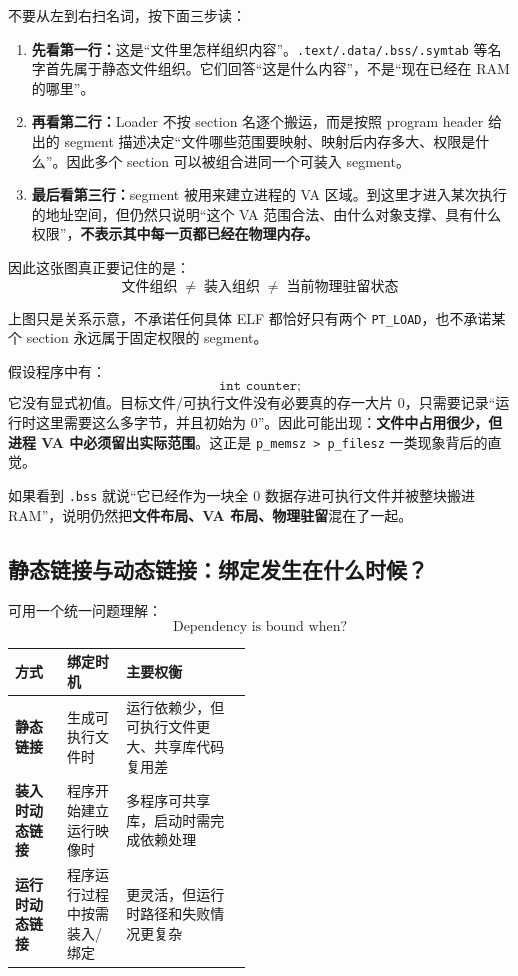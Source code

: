 \documentclass[11pt,a4paper]{ctexart}
\newcommand{\kw}[1]{\textbf{#1}}
\newcommand{\code}[1]{\texttt{#1}}
\begin{document}
\begin{method}[怎样一步一步读这张图？]
不要从左到右扫名词，按下面三步读：
\begin{enumerate}
  \item \kw{先看第一行：}这是“文件里怎样组织内容”。\code{.text/.data/.bss/.symtab} 等名字首先属于静态文件组织。它们回答“这是什么内容”，不是“现在已经在 RAM 的哪里”。
  \item \kw{再看第二行：}Loader 不按 section 名逐个搬运，而是按照 program header 给出的 segment 描述决定“文件哪些范围要映射、映射后内存多大、权限是什么”。因此多个 section 可以被组合进同一个可装入 segment。
  \item \kw{最后看第三行：}segment 被用来建立进程的 VA 区域。到这里才进入某次执行的地址空间，但仍然只说明“这个 VA 范围合法、由什么对象支撑、具有什么权限”，\textbf{不表示其中每一页都已经在物理内存。}
\end{enumerate}

因此这张图真正要记住的是：
\[
\boxed{\text{文件组织}\;\neq\;\text{装入组织}\;\neq\;\text{当前物理驻留状态}}
\]

上图只是关系示意，不承诺任何具体 ELF 都恰好只有两个 \code{PT\_LOAD}，也不承诺某个 section 永远属于固定权限的 segment。
\end{method}

\begin{method}
假设程序中有：
\[
\code{int counter;} 
\]
它没有显式初值。目标文件/可执行文件没有必要真的存一大片 0，只需要记录“运行时这里需要这么多字节，并且初始为 0”。因此可能出现：\kw{文件中占用很少，但进程 VA 中必须留出实际范围}。这正是 \code{p\_memsz > p\_filesz} 一类现象背后的直觉。

如果看到 \code{.bss} 就说“它已经作为一块全 0 数据存进可执行文件并被整块搬进 RAM”，说明仍然把\kw{文件布局、VA 布局、物理驻留}混在了一起。
\end{method}

\subsection{静态链接与动态链接：绑定发生在什么时候？}

可用一个统一问题理解：
\[
\boxed{\text{Dependency is bound when?}}
\]

\begin{center}
\small
\renewcommand{\arraystretch}{1.25}
\begin{tabularx}{\linewidth}{>{\bfseries}p{0.22\linewidth} p{0.25\linewidth} X}
\toprule
方式 & 绑定时机 & 主要权衡\\
\midrule
静态链接 & 生成可执行文件时 & 运行依赖少，但可执行文件更大、共享库代码复用差\\
装入时动态链接 & 程序开始建立运行映像时 & 多程序可共享库，启动时需完成依赖处理\\
运行时动态链接 & 程序运行过程中按需装入/绑定 & 更灵活，但运行时路径和失败情况更复杂\\
\bottomrule
\end{tabularx}
\end{center}
\end{document}
